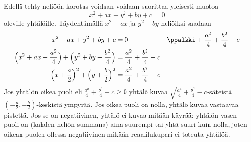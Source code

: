 Edellä tehty neliöön korotus voidaan voidaan suorittaa yleisesti muotoa
\[
x^2+ax+y^2+by+c = 0
\]
oleville yhtälöille. Täydentämällä $x^2+ax$ ja $y^2+by$ neliöiksi saadaan
\begin{align*}
x^2+ax+y^2+by+c &= 0 && \ppalkki +\frac{a^2}{4}+\frac{b^2}{4}-c \\
\Big(x^2+ax+\frac{a^2}{4}\Big)+\Big(y^2+by+\frac{b^2}{4}\Big) &= \frac{a^2}{4}+\frac{b^2}{4}-c  \\
\Big(x+\frac{a}{2}\Big)^2+\Big(y+\frac{b}{2}\Big)^2 &= \frac{a^2}{4}+\frac{b^2}{4}-c
\end{align*}
Jos yhtälön oikea puoli eli $\frac{a^2}{4}+\frac{b^2}{4}-c \geq 0$ yhtälö kuvaa $\sqrt{\frac{a^2}{4}+\frac{b^2}{4}-c}$-säteistä $(-\frac{a}{2}, -\frac{b}{2})$-keskistä ympyrää. Jos oikea puoli on nolla, yhtälö kuvaa vastaavaa pistettä. Jos se on negatiivinen, yhtälö ei kuvaa mitään käyrää: yhtälön vasen puoli on (kahden neliön summana) aina suurempi tai yhtä suuri kuin nolla, joten oikean puolen ollessa negatiivinen mikään reaalilukupari ei toteuta yhtälöä.



